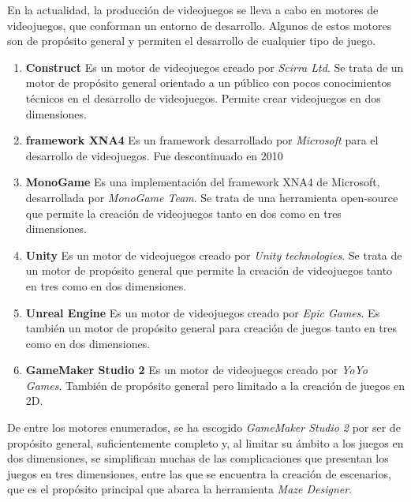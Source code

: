 En la actualidad, la producción de videojuegos se lleva a cabo en motores de videojuegos, que conforman un entorno de desarrollo. Algunos de estos motores son de propósito general y permiten el desarrollo de cualquier tipo de juego.
\begin{enumerate}
	\item \textbf{Construct\cite{construct}} Es un motor de videojuegos creado por \textit{Scirra Ltd}. Se trata de un motor de propósito general orientado a un público con pocos conocimientos técnicos en el desarrollo de videojuegos. Permite crear videojuegos en dos dimensiones.
	\item \textbf{framework XNA4\cite{xna4}} Es un framework desarrollado por \textit{Microsoft} para el desarrollo de videojuegos. Fue descontinuado en 2010
	\item \textbf{MonoGame\cite{monogame}} Es una implementación del framework XNA4 de Microsoft, desarrollada por \textit{MonoGame Team}. Se trata de una herramienta open-source que permite la creación de videojuegos tanto en dos como en tres dimensiones.
	\item \textbf{Unity\cite{unity}} Es un motor de videojuegos creado por \textit{Unity technologies}. Se trata de un motor de propósito general que permite la creación de videojuegos tanto en tres como en dos dimensiones.
	\item \textbf{Unreal Engine\cite{unreal}} Es un motor de videojuegos creado por \textit{Epic Games}. Es también un motor de propósito general para creación de juegos tanto en tres como en dos dimensiones.
	\item \textbf{GameMaker Studio 2\cite{gamemaker}} Es un motor de videojuegos creado por \textit{YoYo Games}. También de propósito general pero limitado a la creación de juegos en 2D.
\end{enumerate}

De entre los motores enumerados, se ha escogido \textit{GameMaker Studio 2} por ser de propósito general, suficientemente completo y, al limitar su ámbito a los juegos en dos dimensiones, se simplifican muchas de las complicaciones que presentan los juegos en tres dimensiones, entre las que se encuentra la creación de escenarios, que es el propósito principal que abarca la herramienta \textit{Maze Designer}.